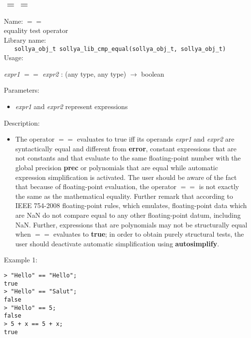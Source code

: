 \subsection{$==$}
\label{labequal}
\noindent Name: \textbf{$==$}\\
\phantom{aaa}equality test operator\\[0.2cm]
\noindent Library name:\\
\verb|   sollya_obj_t sollya_lib_cmp_equal(sollya_obj_t, sollya_obj_t)|\\[0.2cm]
\noindent Usage: 
\begin{center}
\emph{expr1} \textbf{$==$} \emph{expr2} : (\textsf{any type}, \textsf{any type}) $\rightarrow$ \textsf{boolean}\\
\end{center}
Parameters: 
\begin{itemize}
\item \emph{expr1} and \emph{expr2} represent expressions
\end{itemize}
\noindent Description: \begin{itemize}

\item The operator \textbf{$==$} evaluates to true iff its operands \emph{expr1} and
   \emph{expr2} are syntactically equal and different from \textbf{error}, constant
   expressions that are not constants and that evaluate to the same
   floating-point number with the global precision \textbf{prec} or polynomials 
   that are equal while automatic expression simplification is activated. 
   The user should be aware of the fact that because of floating-point 
   evaluation, the operator \textbf{$==$} is not exactly the same as the 
   mathematical equality. Further remark that according to IEEE 754-2008 
   floating-point rules, which \sollya emulates, floating-point data 
   which are NaN do not compare equal to any other floating-point datum, 
   including NaN. Further, expressions that are polynomials may not
   be structurally equal when \textbf{$==$} evaluates to \textbf{true}; in order
   to obtain purely structural tests, the user should deactivate
   automatic simplification using \textbf{autosimplify}.
\end{itemize}
\noindent Example 1: 
\begin{center}\begin{minipage}{15cm}\begin{Verbatim}[frame=single]
> "Hello" == "Hello";
true
> "Hello" == "Salut";
false
> "Hello" == 5;
false
> 5 + x == 5 + x;
true
\end{Verbatim}
\end{minipage}\end{center}

